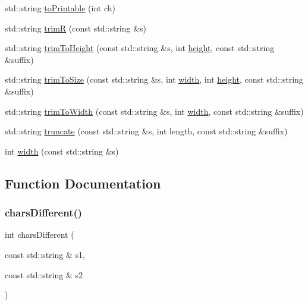 \begin{DoxyCompactItemize}
std\+::string \mbox{\hyperlink{namespacestringutils_a76282454fe7a94b5e58421de779e002f}{to\+Printable}} (int ch)
\item 
std\+::string \mbox{\hyperlink{namespacestringutils_a3dc91629a4fc8f472be9bd83f6514c25}{trimR}} (const std\+::string \&s)
\item 
std\+::string \mbox{\hyperlink{namespacestringutils_a7b8e78be9a57c43689840a89be870ea7}{trim\+To\+Height}} (const std\+::string \&s, int \mbox{\hyperlink{namespacestringutils_a777c9bd90569d1f9d2dc464a69ea45bd}{height}}, const std\+::string \&suffix)
\item 
std\+::string \mbox{\hyperlink{namespacestringutils_a339e8cc8471386ba4314b587f382150d}{trim\+To\+Size}} (const std\+::string \&s, int \mbox{\hyperlink{namespacestringutils_a24e5e1105ba0113729cd02019020cae9}{width}}, int \mbox{\hyperlink{namespacestringutils_a777c9bd90569d1f9d2dc464a69ea45bd}{height}}, const std\+::string \&suffix)
\item 
std\+::string \mbox{\hyperlink{namespacestringutils_a763bfe1246c3b5e99e57aa95c7f5375e}{trim\+To\+Width}} (const std\+::string \&s, int \mbox{\hyperlink{namespacestringutils_a24e5e1105ba0113729cd02019020cae9}{width}}, const std\+::string \&suffix)
\item 
std\+::string \mbox{\hyperlink{namespacestringutils_a1550a8086086257a927e0e95e34486f5}{truncate}} (const std\+::string \&s, int length, const std\+::string \&suffix)
\item 
int \mbox{\hyperlink{namespacestringutils_a24e5e1105ba0113729cd02019020cae9}{width}} (const std\+::string \&s)
\end{DoxyCompactItemize}


\subsection{Function Documentation}
\mbox{\label{namespacestringutils_a3c38f7cde8e6340eb0ff2ae3820a2806}} 
\subsubsection{\texorpdfstring{chars\+Different()}{charsDifferent()}}
{\footnotesize\ttfamily int chars\+Different (\begin{DoxyParamCaption}\item[{const std\+::string \&}]{s1,  }\item[{const std\+::string \&}]{s2 }\end{DoxyParamCaption})}

